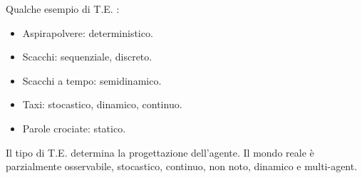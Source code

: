 Qualche esempio di T.E. :

\begin{itemize}
 \item Aspirapolvere: deterministico.
 \item Scacchi: sequenziale, discreto.
 \item Scacchi a tempo: semidinamico.
 \item Taxi: stocastico, dinamico, continuo.
 \item Parole crociate: statico.
\end{itemize}

Il tipo di T.E. determina la progettazione dell'agente.
Il mondo reale è parzialmente osservabile, stocastico, continuo, non noto,
dinamico e multi-agent.
